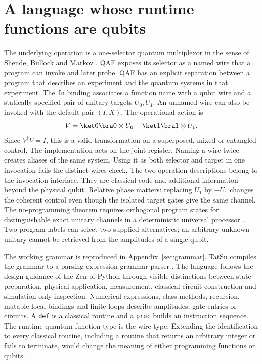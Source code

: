\section{A language whose runtime functions are qubits}
The underlying operation is a one-selector quantum multiplexor in the sense of Shende, Bullock and Markov \cite{shende}. QAF exposes its selector as a named wire that a program can invoke and later probe.
QAF has an explicit separation between a program that describes an experiment and the quantum systems in that experiment. The \texttt{fn} binding associates a function name with a qubit wire and a statically specified pair of unitary targets $U_0,U_1$. An unnamed wire can also be invoked with the default pair $(I,X)$. The operational action is
\[
 V=\ket0\bra0\otimes U_0+\ket1\bra1\otimes U_1 .
\]
Since $V^\dagger V=I$, this is a valid transformation on a superposed, mixed or entangled control. The implementation acts on the joint register. Naming a wire twice creates aliases of the same system. Using it as both selector and target in one invocation fails the distinct-wires check. The two operation descriptions belong to the invocation interface. They are classical code and additional information beyond the physical qubit. Relative phase matters: replacing $U_1$ by $-U_1$ changes the coherent control even though the isolated target gates give the same channel. The no-programming theorem requires orthogonal program states for distinguishable exact unitary channels in a deterministic universal processor \cite{noprogram}. Two program labels can select two supplied alternatives; an arbitrary unknown unitary cannot be retrieved from the amplitudes of a single qubit.

The working grammar is reproduced in Appendix~\ref{sec:grammar}. TatSu compiles the grammar to a parsing-expression-grammar parser \cite{tatsu}. The language follows the design guidance of the Zen of Python \cite{zen} through visible distinctions between state preparation, physical application, measurement, classical circuit construction and simulation-only inspection. Numerical expressions, class methods, recursion, mutable local bindings and finite loops describe amplitudes, gate entries or circuits. A \texttt{def} is a classical routine and a \texttt{proc} builds an instruction sequence. The runtime quantum-function type is the wire type. Extending the identification to every classical routine, including a routine that returns an arbitrary integer or fails to terminate, would change the meaning of either programming functions or qubits.

